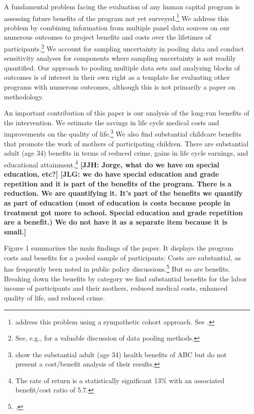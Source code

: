 A fundamental problem facing the evaluation of any human capital program is assessing future benefits of the program not yet surveyed.\footnote{\cite{Mincer_Polachek_1974_JPE} address this problem using a sympathetic cohort approach. See \cite{Heckman_Lochner_etal_2008_JHC}.} We address this problem by combining information from multiple panel data sources on our numerous outcomes to project benefits and costs over the lifetimes of participants.\footnote{See, e.g., \citealp{Ridder_Moffitt_2007_hbk_metricsdata} for a valuable discussion of data pooling methods.} We account for sampling uncertainty in pooling data and conduct sensitivity analyses for components where sampling uncertainty is not readily quantified. Our approach to pooling multiple data sets and analyzing blocks of outcomes is of interest in their own right as a template for evaluating other programs with numerous outcomes, although this is not primarily a paper on methodology.

An important contribution of this paper is our analysis of the long-run benefits of the intervention. We estimate the savings in life cycle medical costs and improvements on the quality of life.\footnote{\cite{Campbell_Conti_etal_2014_EarlyChildhoodInvestments} show the substantial adult (age 34) health benefits of ABC but do not present a cost/benefit analysis of their results.} We also find substantial childcare benefits that promote the work of mothers of participating children. There are substantial adult (age 34) benefits in terms of reduced crime, gains in life cycle earnings, and educational attainment.\footnote{The rate of return is a statistically significant 13\% with an associated benefit/cost ratio of 5.7.} \textbf{[JJH: Jorge, what do we have on special education, etc?] [JLG: we do have special education and grade repetition and it is part of the benefits of the program. There is a reduction. We are quantifying it. It's part of the benefits we quantify as part of education (most of education is costs because people in treatment got more to school. Special education and grade repetition are a benefit.) We do not have it as a separate item because it is small.]}

Figure 1 summarizes the main findings of the paper. It displays the program costs and benefits for a pooled sample of participants: Costs are substantial, as has frequently been noted in public policy discussions.\footnote{\cite{Whitehurst_2014_Senate_Testimony}.} But so are benefits. Breaking down the benefits by category we find substantial benefits for the labor income of participants and their mothers, reduced medical costs, enhanced quality of life, and reduced crime.

